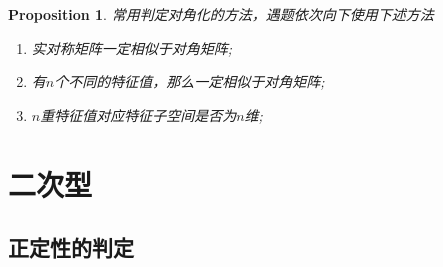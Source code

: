 \documentclass{article}
\newtheorem{proposition}[theorem]{Proposition}
\begin{document}
\begin{proposition}
\rm 常用判定对角化的方法，遇题依次向下使用下述方法
\begin{enumerate}
	\item 实对称矩阵一定相似于对角矩阵;	
	\item 有$n$个不同的特征值，那么一定相似于对角矩阵;
	\item $n$重特征值对应特征子空间是否为$n$维;
\end{enumerate}
\end{proposition}

\section{二次型}

\subsection{正定性的判定}
\end{document}
